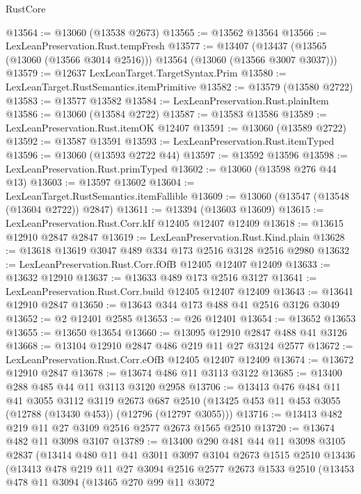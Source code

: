 \begin{lexlean}{RustCore}
\begin{coremodule}
@13564 := @13060 (@13538 @2673)
@13565 := @13562 @13564
@13566 := LexLeanPreservation.Rust.tempFresh
@13577 := @13407
    (@13437 (@13565 (@13060 (@13566 @3014 @2516))) @13564 (@13060 (@13566 @3007 @3037)))
@13579 := @12637 LexLeanTarget.TargetSyntax.Prim
@13580 := LexLeanTarget.RustSemantics.itemPrimitive
@13582 := @13579 (@13580 @2722)
@13583 := @13577 @13582
@13584 := LexLeanPreservation.Rust.plainItem
@13586 := @13060 (@13584 @2722)
@13587 := @13583 @13586
@13589 := LexLeanPreservation.Rust.itemOK @12407
@13591 := @13060 (@13589 @2722)
@13592 := @13587 @13591
@13593 := LexLeanPreservation.Rust.itemTyped
@13596 := @13060 (@13593 @2722 @44)
@13597 := @13592 @13596
@13598 := LexLeanPreservation.Rust.primTyped
@13602 := @13060 (@13598 @276 @44 @13)
@13603 := @13597 @13602
@13604 := LexLeanTarget.RustSemantics.itemFallible
@13609 := @13060 (@13547 (@13548 (@13604 @2722)) @2847)
@13611 := @13394 (@13603 @13609)
@13615 := LexLeanPreservation.Rust.Corr.kIf @12405 @12407 @12409
@13618 := @13615 @12910 @2847 @2847
@13619 := LexLeanPreservation.Rust.Kind.plain
@13628 := @13618 @13619 @3047 @489 @334 @173 @2516 @3128 @2516 @2980
@13632 := LexLeanPreservation.Rust.Corr.fOfB @12405 @12407 @12409
@13633 := @13632 @12910
@13637 := @13633 @489 @173 @2516 @3127
@13641 := LexLeanPreservation.Rust.Corr.build @12405 @12407 @12409
@13643 := @13641 @12910 @2847
@13650 := @13643 @344 @173 @488 @41 @2516 @3126 @3049
@13652 := @2 @12401 @2585
@13653 := @26 @12401
@13654 := @13652 @13653
@13655 := @13650 @13654
@13660 := @13095 @12910 @2847 @488 @41 @3126
@13668 := @13104 @12910 @2847 @486 @219 @11 @27 @3124 @2577
@13672 := LexLeanPreservation.Rust.Corr.eOfB @12405 @12407 @12409
@13674 := @13672 @12910 @2847
@13678 := @13674 @486 @11 @3113 @3122
@13685 := @13400 @288 @485 @44 @11 @3113 @3120 @2958
@13706 := @13413
    @476
    @484
    @11
    @41
    @3055
    @3112
    @3119
    @2673
    @687
    @2510
    (@13425 @453 @11 @453 @3055 (@12788 (@13430 @453)) (@12796 (@12797 @3055)))
@13716 := @13413 @482 @219 @11 @27 @3109 @2516 @2577 @2673 @1565 @2510
@13720 := @13674 @482 @11 @3098 @3107
@13789 := @13400
    @290
    @481
    @44
    @11
    @3098
    @3105
    @2837
    (@13414
      @480
      @11
      @41
      @3011
      @3097
      @3104
      @2673
      @1515
      @2510
      @13436
      (@13413
        @478
        @219
        @11
        @27
        @3094
        @2516
        @2577
        @2673
        @1533
        @2510
        (@13453
          @478
          @11
          @3094
          (@13465
            @270
            @99
            @11
            @3072

\end{coremodule}
\end{lexlean}
